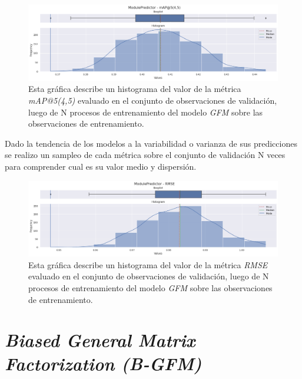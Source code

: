 \documentclass[11pt,a4paper,twoside]{thesis}
\begin{document}
{\clearpage

\begin{figure}[h!]
	\centering
	\includegraphics[width=15cm]{./images/metrics-GFM-mapk.png}
	\caption{Esta gráfica describe un histograma del valor de la métrica \textit{mAP@5(4,5)} evaluado en el conjunto de observaciones de validación, luego de N procesos de entrenamiento del modelo \textit{GFM} sobre las observaciones de entrenamiento.}
\end{figure}

Dado la tendencia de los modelos a la variabilidad o varianza de sus
predicciones se realizo un sampleo de cada métrica sobre el conjunto de
validación N veces para comprender cual es su valor medio y dispersión.

\begin{figure}[h!]
	\centering
	\includegraphics[width=15cm]{./images/metrics-GFM-RMSE.png}
	\caption{Esta gráfica describe un histograma del valor de la métrica \textit{RMSE} evaluado en el conjunto de observaciones de validación, luego de N procesos de entrenamiento del modelo \textit{GFM} sobre las observaciones de entrenamiento.}
\end{figure}

\clearpage
\section{\textit{Biased General Matrix Factorization (B-GFM)}}

}
\end{document}
